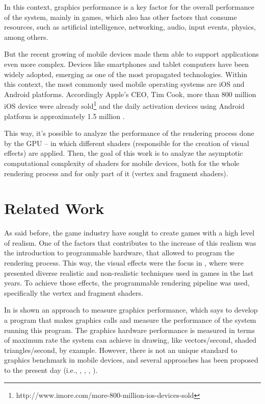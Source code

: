 \documentclass[10pt, conference, compsocconf]{IEEEtran}
\begin{document}
In this context, graphics performance is a key factor for the overall performance 
of the system, mainly in games, which also has other factors that consume
resources, such as artificial intelligence, networking, audio, input events, physics, among
others.

But the recent growing of mobile devices made them able to support 
applications even more complex. Devices like smartphones and tablet computers
have been widely adopted, emerging as one of the most propagated technologies.
Within this context, the most commonly used mobile operating systems are iOS 
and Android platforms. Accordingly Apple's CEO, Tim Cook, more than 800 million iOS device
were already sold\footnote{http://www.imore.com/more-800-million-ios-devices-sold}
 and the daily activation devices using Android platform is approximately 1.5 million \cite{android2013}.

This way, it's possible to analyze the performance of the rendering process done
by the GPU -- in which different shaders (responsible for the creation of
visual effects) are applied. Then, the goal of this work is to analyze the asymptotic computational
complexity of shaders for mobile devices, both for the whole rendering process
and for only part of it (vertex and fragment shaders).

\section{Related Work}
\label{sec:related-work}

As said before, the game industry have sought to create games with a high level of realism.
One of the factors that contributes to the increase of this realism 
was the introduction to programmable hardware, that allowed to program the 
rendering process. This way, the visual effects were the focus in \cite{sbgames2}, where were 
presented diverse realistic and non-realistic techniques used in games in the last years. To
achieve those effects, the programmable rendering pipeline was used,
specifically the vertex and fragment shaders.

In \cite{compaq} is shown an approach to measure graphics performance, which says to develop
a program that makes graphics calls and measure the performance of the
system running this program. The graphics hardware performance is measured
in terms of maximum rate the system can achieve in drawing, like vectors/second,
shaded triangles/second, by example. However, there is not an
unique standard to graphics benchmark in mobile devices, and several approaches has been 
proposed to the present day (i.e., \cite{nah2016}, \cite{ma2013}, \cite{Arnau2013},
\cite{Johnsson2014}).
\end{document}
